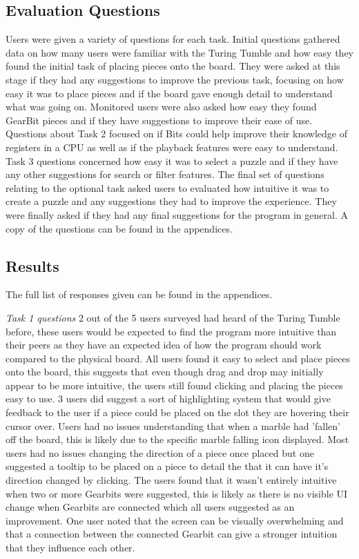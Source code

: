 \documentclass{l4proj}
\begin{document}
\subsection{Evaluation Questions}
Users were given a variety of questions for each task. Initial questions gathered data on how many users were familiar with the Turing Tumble and how easy they found the initial task of placing pieces onto the board. They were asked at this stage if they had any suggestions to improve the previous task, focusing on how easy it was to place pieces and if the board gave enough detail to understand what was going on. Monitored users were also asked how easy they found GearBit pieces and if they have suggestions to improve their ease of use. Questions about Task 2 focused on if Bits could help improve their knowledge of registers in a CPU as well as if the playback features were easy to understand. Task 3 questions concerned how easy it was to select a puzzle and if they have any other suggestions for search or filter features. The final set of questions relating to the optional task asked users to evaluated how intuitive it was to create a puzzle and any suggestions they had to improve the experience. They were finally asked if they had any final suggestions for the program in general. A copy of the questions can be found in the appendices.

\subsection{Results}
The full list of responses given can be found in the appendices.

\emph{Task 1 questions}
2 out of the 5 users surveyed had heard of the Turing Tumble before, these users would be expected to find the program more intuitive than their peers as they have an expected idea of how the program should work compared to the physical board. All users found it easy to select and place pieces onto the board, this suggests that even though drag and drop may initially appear to be more intuitive, the users still found clicking and placing the pieces easy to use. 3 users did suggest a sort of highlighting system that would give feedback to the user if a piece could be placed on the slot they are hovering their cursor over. Users had no issues understanding that when a marble had 'fallen' off the board, this is likely due to the specific marble falling icon displayed. Most users had no issues changing the direction of a piece once placed but one suggested a tooltip to be placed on a piece to detail the that it can have it's direction changed by clicking. The users found that it wasn't entirely intuitive when two or more Gearbits were suggested, this is likely as there is no visible UI change when Gearbits are connected which all users suggested as an improvement. One user noted that the screen can be visually overwhelming and that a connection between the connected Gearbit can give a stronger intuition that they influence each other.
\end{document}
